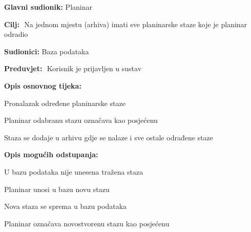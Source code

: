		\noindent {}
		\begin{packed_item}
			
			\item \textbf{Glavni sudionik: }$ $Planinar$ $
			\item  \textbf{Cilj:} $ $ Na jednom mjestu (arhiva) imati sve planinarske staze koje je planinar odradio$ $
			\item  \textbf{Sudionici:} $ $Baza podataka $ $
			\item  \textbf{Preduvjet:} $ $ Korisnik je prijavljen u sustav $ $
			\item  \textbf{Opis osnovnog tijeka:}
			
			\item[] \begin{packed_enum}
				
				\item $ $Pronalazak određene planinarske staze $ $
				\item $ $Planinar odabranu stazu označava kao posjećenu $ $
				\item $ $Staza se dodaje u arhivu gdje se nalaze i sve ostale odrađene staze$ $
				
			\end{packed_enum}
			
			\item  \textbf{Opis mogućih odstupanja:}
			
			\item[] \begin{packed_item}
				
				\item[1.a] $ $U bazu podataka nije unesena tražena staza$ $
				\item[] \begin{packed_enum}
					
					\item $ $Planinar unosi u bazu novu stazu $ $
					\item $ $Nova staza se sprema u bazu podataka $ $
					\item $ $Planinar označava novostvorenu stazu kao posjećenu $ $
				\end{packed_enum}
			\end{packed_item}
		\end{packed_item}
	
